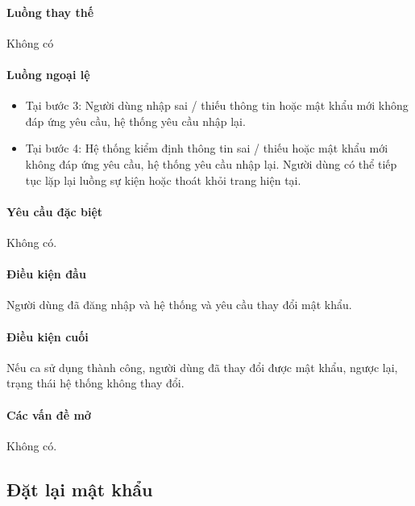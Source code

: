 \documentclass[./../main.tex]{subfiles}
\begin{document}
\paragraph*{Luồng thay thế} Không có

\paragraph*{Luồng ngoại lệ}

\begin{itemize}
\item
  
  Tại bước 3: Người dùng nhập sai / thiếu thông tin hoặc mật khẩu mới
  không đáp ứng yêu cầu, hệ thống yêu cầu nhập lại.
  
\item
  
  Tại bước 4: Hệ thống kiểm định thông tin sai / thiếu hoặc mật khẩu mới
  không đáp ứng yêu cầu, hệ thống yêu cầu nhập lại. Người dùng có thể
  tiếp tục lặp lại luồng sự kiện hoặc thoát khỏi trang hiện tại.
  
\end{itemize}

\paragraph*{Yêu cầu đặc biệt}

Không có.

\paragraph*{Điều kiện đầu}

Người dùng đã đăng nhập và hệ thống và yêu cầu thay đổi mật khẩu.

\paragraph*{Điều kiện cuối}

Nếu ca sử dụng thành công, người dùng đã thay đổi được mật khẩu, ngược
lại, trạng thái hệ thống không thay đổi.

\paragraph*{Các vấn đề mở}

Không có.

\subsection{Đặt lại mật khẩu}
\end{document}
